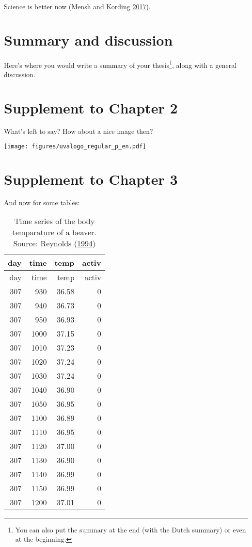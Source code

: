 \documentclass[10pt,english,]{book} %
\let\rmarkdownfootnote\footnote%
\def\footnote{\protect\rmarkdownfootnote}
\theoremstyle{definition}
\theoremstyle{definition}
\theoremstyle{definition}
\theoremstyle{remark}
\begin{document}
Science is better now (Mensh and Kording \protect\hyperlink{ref-Mensh2017}{2017}).

\hypertarget{summary-and-discussion}{%
\chapter{Summary and discussion}\label{summary-and-discussion}}

Here's where you would write a summary of your thesis\footnote{You can also put the summary at the end (with the Dutch summary) or even at the beginning.}, along with a general discussion.

\hypertarget{appendix-appendix}{%
\appendix}


\hypertarget{supplement-to-chapter-2}{%
\chapter{Supplement to Chapter 2}\label{supplement-to-chapter-2}}

What's left to say? How about a nice image then?

\texttt{[image: figures/uvalogo\_regular\_p\_en.pdf]}

\hypertarget{supplement-to-chapter-3}{%
\chapter{Supplement to Chapter 3}\label{supplement-to-chapter-3}}

And now for some tables:

\begin{longtable}[]{@{}rrrr@{}}
\caption{\label{tab:beaver-2} Time series of the body temparature of a beaver. Source: Reynolds (\protect\hyperlink{ref-Reynolds1994}{1994})}\tabularnewline
\toprule
day & time & temp & activ\tabularnewline
\midrule
\endfirsthead
\toprule
day & time & temp & activ\tabularnewline
\midrule
\endhead
307 & 930 & 36.58 & 0\tabularnewline
307 & 940 & 36.73 & 0\tabularnewline
307 & 950 & 36.93 & 0\tabularnewline
307 & 1000 & 37.15 & 0\tabularnewline
307 & 1010 & 37.23 & 0\tabularnewline
307 & 1020 & 37.24 & 0\tabularnewline
307 & 1030 & 37.24 & 0\tabularnewline
307 & 1040 & 36.90 & 0\tabularnewline
307 & 1050 & 36.95 & 0\tabularnewline
307 & 1100 & 36.89 & 0\tabularnewline
307 & 1110 & 36.95 & 0\tabularnewline
307 & 1120 & 37.00 & 0\tabularnewline
307 & 1130 & 36.90 & 0\tabularnewline
307 & 1140 & 36.99 & 0\tabularnewline
307 & 1150 & 36.99 & 0\tabularnewline
307 & 1200 & 37.01 & 0\tabularnewline
\bottomrule
\end{longtable}
\end{document}
